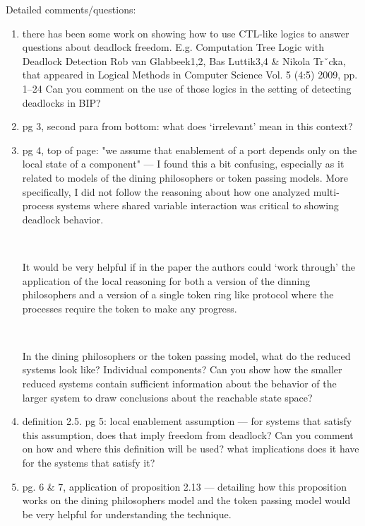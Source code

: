 Detailed comments/questions:
\begin{enumerate}

\item there has been some work on showing how to use CTL-like logics to answer
questions about deadlock freedom.  E.g.
  Computation Tree Logic with Deadlock Detection
  Rob van Glabbeek1,2, Bas Luttik3,4 \& Nikola Trˇcka, that appeared in
  Logical Methods in Computer Science
  Vol. 5 (4:5) 2009, pp. 1–24
Can you comment on the use of those logics in the setting of detecting deadlocks in
BIP?

\item  pg 3, second para from bottom: what does `irrelevant' mean in this context?

\item pg 4, top of page: "we assume that enablement of a port depends only on the
local state of a component" --- I found this a bit confusing, especially as it related
to models of the dining philosophers or token passing models.  More specifically, I
did not follow the reasoning about how one analyzed multi-process systems
where shared variable interaction was critical to showing deadlock behavior.

~

It would be very helpful if in the paper the authors could `work through' the application
of the local reasoning for both a version of the dinning philosophers and a version
of a single token ring like protocol where the processes require the token to make
any progress.

~

 In the dining philosophers or the token passing model, what do the reduced systems
look like? Individual components?  Can you show how the smaller reduced systems
contain sufficient information about the behavior of the larger system to draw conclusions
about the reachable state space?


\item  definition 2.5. pg 5:  local enablement assumption --- for systems that satisfy
this assumption, does that imply freedom from deadlock?   Can you comment on how and where
this definition will be used?  what implications does it have for the systems that satisfy it?

\item  pg. 6 \& 7, application of proposition 2.13 --- detailing how this proposition works
on the dining philosophers model and the token passing model would be very helpful
for understanding the technique.


\end{enumerate}

